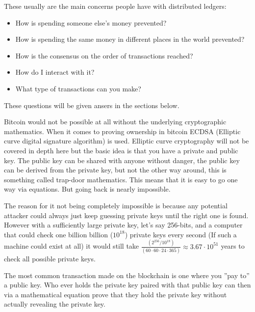 These usually are the main concerns people have with distributed ledgers:
\begin{itemize}
	\item How is spending someone else's money prevented?
	\item How is spending the same money in different places in the world prevented?
	\item How is the consensus on the order of transactions reached?
	\item How do I interact with it?
	\item What type of transactions can you make?
\end{itemize}

These questions will be given ansers in the sections below.

Bitcoin would not be possible at all without the underlying cryptographic mathematics. When it comes to proving ownership in bitcoin ECDSA (Elliptic curve digital signature algorithm)\cite{ecc_def} is used. Elliptic curve cryptography will not be covered in depth here but the basic idea is that you have a private and public key. The public key can be shared with anyone without danger, the public key can be derived from the private key, but not the other way around, this is something called trap-door mathematics.\cite{ecc_def}\cite{antonopoulos_2017} This means that it is easy to go one way via equations. But going back is nearly impossible. 

The reason for it not being completely impossible is because any potential attacker could always just keep guessing private keys until the right one is found. However with a sufficiently large private key, let's say 256-bits, and a computer that could check one billion billion ($10^{18}$) private keys every second (If such a machine could exist at all) it would still take $\frac{(2^{256} / 10^{18})}{(60\cdot60\cdot24\cdot365)}\approx3.67\cdot10^{51}$ years to check all possible private keys.

The most common transaction made on the blockchain is one where you ''pay to'' a public key. Who ever holds the private key paired with that public key can then via a mathematical equation prove that they hold the private key without actually revealing the private key.\cite{quantabytes}

